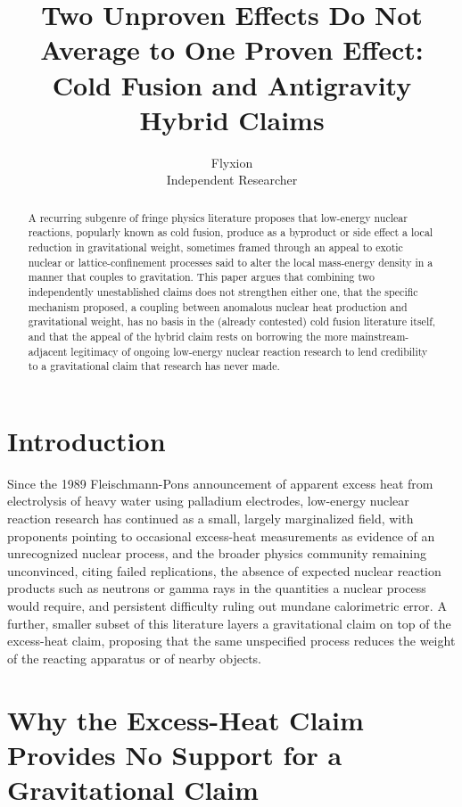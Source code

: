 \documentclass[11pt]{article}
\title{Two Unproven Effects Do Not Average to One Proven Effect: Cold Fusion and Antigravity Hybrid Claims}
\author{Flyxion \\ \small Independent Researcher}
\date{}
\begin{document}
\maketitle

\begin{abstract}
A recurring subgenre of fringe physics literature proposes that low-energy nuclear reactions, popularly known as cold fusion, produce as a byproduct or side effect a local reduction in gravitational weight, sometimes framed through an appeal to exotic nuclear or lattice-confinement processes said to alter the local mass-energy density in a manner that couples to gravitation. This paper argues that combining two independently unestablished claims does not strengthen either one, that the specific mechanism proposed, a coupling between anomalous nuclear heat production and gravitational weight, has no basis in the (already contested) cold fusion literature itself, and that the appeal of the hybrid claim rests on borrowing the more mainstream-adjacent legitimacy of ongoing low-energy nuclear reaction research to lend credibility to a gravitational claim that research has never made.
\end{abstract}

\section{Introduction}

Since the 1989 Fleischmann-Pons announcement of apparent excess heat from electrolysis of heavy water using palladium electrodes, low-energy nuclear reaction research has continued as a small, largely marginalized field, with proponents pointing to occasional excess-heat measurements as evidence of an unrecognized nuclear process, and the broader physics community remaining unconvinced, citing failed replications, the absence of expected nuclear reaction products such as neutrons or gamma rays in the quantities a nuclear process would require, and persistent difficulty ruling out mundane calorimetric error. A further, smaller subset of this literature layers a gravitational claim on top of the excess-heat claim, proposing that the same unspecified process reduces the weight of the reacting apparatus or of nearby objects.

\section{Why the Excess-Heat Claim Provides No Support for a Gravitational Claim}
\end{document}
